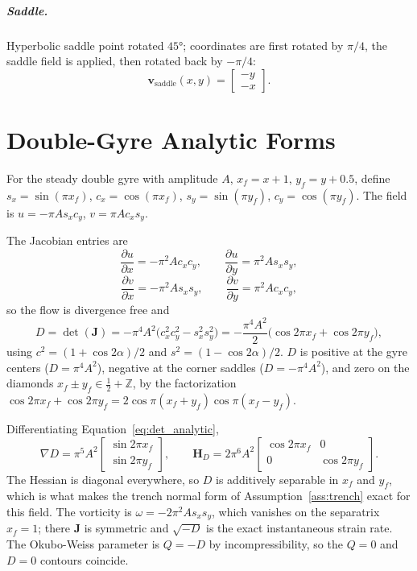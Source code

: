 \documentclass[12pt, letterpaper, oneside]{report}
\begin{document}
\paragraph{Saddle.} Hyperbolic saddle point rotated $45°$; coordinates are
first rotated by $\pi/4$, the saddle field is applied, then rotated back by
$-\pi/4$:
\begin{equation}
\mathbf{v}_{\text{saddle}}(x,y) = \begin{bmatrix} -y \\ -x \end{bmatrix}.
\end{equation}

\chapter{Double-Gyre Analytic Forms}
\label{app:double_gyre}

For the steady double gyre with amplitude $A$, $x_f=x+1$, $y_f=y+0.5$,
define $s_x=\sin(\pi x_f)$, $c_x=\cos(\pi x_f)$, $s_y=\sin(\pi y_f)$,
$c_y=\cos(\pi y_f)$. The field is $u=-\pi A s_xc_y$, $v=\pi Ac_xs_y$.

The Jacobian entries are
\begin{equation}
\frac{\partial u}{\partial x} = -\pi^2Ac_xc_y, \qquad \frac{\partial u}{\partial y} = \pi^2As_xs_y,
\end{equation}
\begin{equation}
\frac{\partial v}{\partial x} = -\pi^2As_xs_y, \qquad \frac{\partial v}{\partial y} = \pi^2Ac_xc_y,
\end{equation}
so the flow is divergence free and
\begin{equation}
D = \det(\mathbf{J}) = -\pi^4A^2\bigl(c_x^2c_y^2 - s_x^2s_y^2\bigr) = -\frac{\pi^4A^2}{2}\bigl(\cos2\pi x_f + \cos2\pi y_f\bigr),
\label{eq:det_analytic}
\end{equation}
using $c^2=(1+\cos2\alpha)/2$ and $s^2=(1-\cos2\alpha)/2$. $D$ is positive
at the gyre centers ($D=\pi^4A^2$), negative at the corner saddles
($D=-\pi^4A^2$), and zero on the diamonds
$x_f\pm y_f\in\tfrac12+\mathbb{Z}$, by the factorization
$\cos2\pi x_f+\cos2\pi y_f = 2\cos\pi(x_f+y_f)\cos\pi(x_f-y_f)$.

Differentiating Equation~\eqref{eq:det_analytic},
\begin{equation}
\nabla D = \pi^5A^2\begin{bmatrix}\sin2\pi x_f\\\sin2\pi y_f\end{bmatrix},
\qquad
\mathbf{H}_D = 2\pi^6A^2\begin{bmatrix}\cos2\pi x_f & 0\\0 & \cos2\pi y_f\end{bmatrix}.
\label{eq:gradhess_analytic}
\end{equation}
The Hessian is diagonal everywhere, so $D$ is additively separable in
$x_f$ and $y_f$, which is what makes the trench normal form of
Assumption~\ref{ass:trench} exact for this field. The vorticity is
$\omega=-2\pi^2As_xs_y$, which vanishes on the separatrix $x_f=1$; there
$\mathbf{J}$ is symmetric and $\sqrt{-D}$ is the exact instantaneous
strain rate. The Okubo-Weiss parameter is $Q=-D$ by incompressibility, so
the $Q=0$ and $D=0$ contours coincide.
\end{document}
